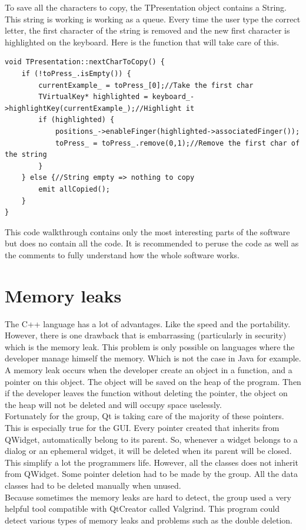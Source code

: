 To save all the characters to copy, the TPresentation object contains a String. This string is working is working as a queue. Every time the user type the correct letter, the first character of the string is removed and the new first character is highlighted on the keyboard. Here is the function that will take care of this.
\begin{lstlisting}
void TPresentation::nextCharToCopy() {
    if (!toPress_.isEmpty()) {
        currentExample_ = toPress_[0];//Take the first char
        TVirtualKey* highlighted = keyboard_->highlightKey(currentExample_);//Highlight it
        if (highlighted) {
            positions_->enableFinger(highlighted->associatedFinger());
            toPress_ = toPress_.remove(0,1);//Remove the first char of the string
        }
    } else {//String empty => nothing to copy
        emit allCopied();
    }
}
\end{lstlisting}

This code walkthrough contains only the most interesting parts of the software but does no contain all the code. It is recommended to peruse the code as well as the comments to fully understand how the whole software works.

\chapter{Memory leaks}
The C++ language has a lot of advantages. Like the speed and the portability. However, there is one drawback that is embarrassing (particularly in security) which is the memory leak. This problem is only possible on languages where the developer manage himself the memory. Which is not the case in Java for example. A memory leak occurs when the developer create an object  in a function, and a pointer on this object. The object will be saved on the heap of the program. Then if the developer leaves the function without deleting the pointer, the object on the heap will not be deleted and will occupy space uselessly. \\
Fortunately for the group, Qt is taking care of the majority of these pointers. This is especially true for the GUI. Every pointer created that inherits from QWidget, automatically belong to its parent. So, whenever a widget belongs to a dialog or an ephemeral widget, it will be deleted when its parent will be closed. This simplify a lot the programmers life. However, all the classes does not inherit from QWidget. Some pointer deletion had to be made by the group. All the data classes had to be deleted manually when unused.\\
Because sometimes the memory leaks are hard to detect, the group used a very helpful tool compatible with QtCreator called Valgrind. This program could detect various types of memory leaks and problems such as the double deletion.


